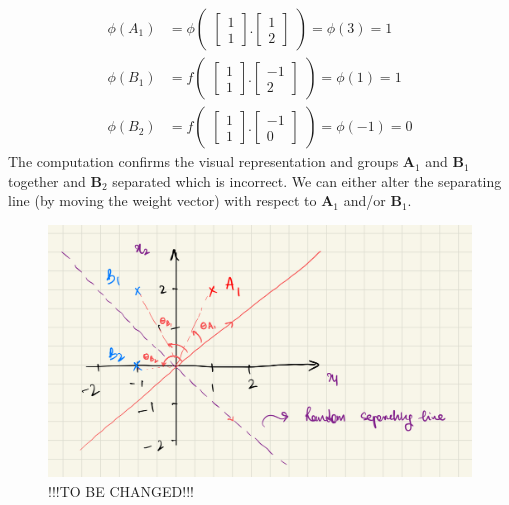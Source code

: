 \begin{align*}
  \phi(A_1) &= \phi\begin{pmatrix}
    \begin{bmatrix}
      1\\
      1
    \end{bmatrix}.\begin{bmatrix}
      1 \\
      2
    \end{bmatrix}
  \end{pmatrix} = \phi(3) = 1 \\
  \phi(B_1) &= f\begin{pmatrix}
    \begin{bmatrix}
      1\\
      1
    \end{bmatrix}.\begin{bmatrix}
      -1 \\
      2
    \end{bmatrix}
  \end{pmatrix} = \phi(1) = 1 \\
  \phi(B_2) &= f\begin{pmatrix}
    \begin{bmatrix}
      1\\
      1
    \end{bmatrix}.\begin{bmatrix}
      -1 \\
      0
    \end{bmatrix}
  \end{pmatrix} = \phi(-1) = 0
\end{align*}
The computation confirms the visual representation and groups $\textbf{A}_1$ and $\textbf{B}_1$ together and $\textbf{B}_2$ separated which is incorrect. We can either alter the separating line (by moving the weight vector) with respect to $\textbf{A}_1$ and/or $\textbf{B}_1$.
\begin{figure}[H]
  \centering
  \includegraphics[scale=0.20]{CHAPTER_2/c2_fig_perceptron_example_3.jpeg}
  \caption{!!!TO BE CHANGED!!!}
  \label{fig:perceptron_example_3}
\end{figure}
